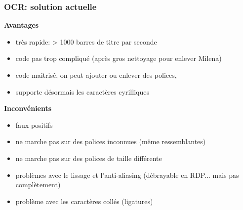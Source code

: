 \documentclass[xcolor=dvipsnames]{beamer}
\begin{document}
\begin{frame}
\frametitle{OCR: solution actuelle}
    \begin{center}\begin{alertblock}{}
            \begin{center}\textbf{\Large Avantages}\end{center}
    \end{alertblock}\end{center}\pause
    \begin{itemize}
    \item très rapide: > 1000 barres de titre par seconde\pause
    \item code pas trop compliqué \pause(après gros nettoyage pour enlever Milena)\pause
    \item code maitrisé, on peut ajouter ou enlever des polices, \pause
    \item supporte désormais les caractères cyrilliques\pause
    \end{itemize}
    \begin{center}\begin{alertblock}{}
            \begin{center}\textbf{\Large Inconvénients}\end{center}\pause
    \end{alertblock}\end{center}
    \begin{itemize}
    \item faux positifs\pause
    \item ne marche pas sur des polices inconnues (même ressemblantes)\pause
    \item ne marche pas sur des polices de taille différente\pause
    \item problèmes avec le lissage et l'anti-aliasing (débrayable en RDP... mais pas complètement)\pause
    \item problème avec les caractères collés (ligatures)
    \end{itemize}
\end{frame}
\end{document}
